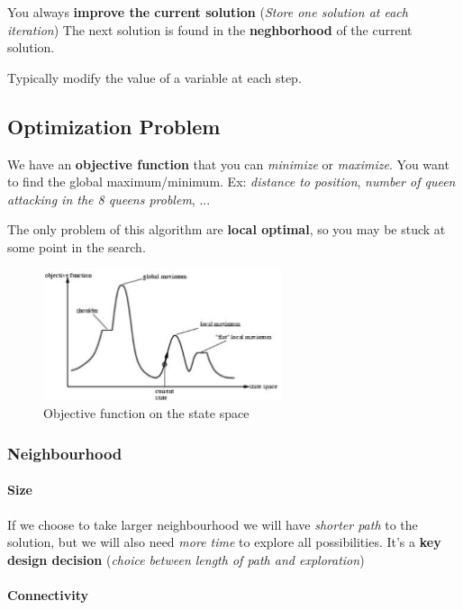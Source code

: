 You always \textbf{improve the current solution} (\textit{Store one solution at each iteration})
The next solution is found in the \textbf{neghborhood} of the current solution.

Typically modify the value of a variable at each step.

\subsection{Optimization Problem}

We have an \textbf{objective function} that you can \textit{minimize} or
\textit{maximize}.  You want  to  find the  global maximum/minimum.  Ex:
\textit{distance to position}, \textit{number  of queen attacking in the
8 queens problem}, ...

The only  problem of this  algorithm are \textbf{local optimal},  so you
may be stuck at some point in the search.

\begin{figure}[h]
    \centering
    \includegraphics[width=7cm]{local.png}
    \caption{Objective function on the state space}
\end{figure}

\subsubsection{Neighbourhood}

\paragraph{Size} 
If we choose  to take larger neighbourhood we  will have \textit{shorter
path}  to the  solution, but  we will  also need  \textit{more time}  to
explore all possibilities. It's a \textbf{key design decision} (\textit{choice
between length of path and exploration})

\paragraph{Connectivity}

